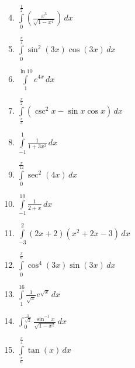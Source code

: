 \documentclass[12pt]{article}
\newif\ifans
\begin{document}
\begin{enumerate}
\setcounter{enumi}{3}

\item $\int\limits_{0}^{\frac{1}{2}}\left(\frac{x^3}{\sqrt{1-x^4}}\right)\,dx$ 

\ifans{\fbox{$\frac{4-\sqrt{15}}{8}$}} \fi

\item $\int\limits_{0}^{\frac{\pi}{4}} \sin^{2}(3x)\cos{(3x)}\,dx$ 

\ifans{\fbox{$\frac{\sqrt{2}}{36}$}} \fi

\item $\int\limits_{1}^{\ln{10}}e^{4x}\,dx$ 

\ifans{\fbox{$2500-\frac{1}{4}e^{4}$}} \fi

\item $\int\limits_{\frac{\pi}{3}}^{\frac{\pi}{2}}(\csc^{2}{x}-\sin{x}\cos{x})\,dx$ 

\ifans{\fbox{$\frac{1}{\sqrt{3}}-\frac{1}{8}$}} \fi

\item $\int\limits_{-1}^{1}\frac{1}{1+3x^2}\,dx$ 

\ifans{\fbox{$\frac{2\pi\sqrt{3}}{9}$}} \fi

\item $\int\limits_{0}^{\frac{\pi}{12}} \sec^2{(4x)}\,dx$ 

\ifans{\fbox{$\frac{\sqrt{3}}{4}$}} \fi

\item $\int\limits_{-1}^{10}\frac{1}{2+x}\,dx$ 

\ifans{\fbox{$\ln{12}$}} \fi

\item $\int\limits_{-3}^{2} (2x+2)(x^2+2x-3)\,dx$ 

\ifans{\fbox{$\frac{25}{2}$}} \fi

\item $\int\limits_{0}^{\frac{\pi}{6}} \cos^4{(3x)}\sin{(3x)}\,dx$ 

\ifans{\fbox{$\frac{1}{15}$}} \fi

\item $\int\limits_{1}^{16}\frac{1}{\sqrt{x}}e^{\sqrt{x}}\,dx$ 

\ifans{\fbox{$-2e+2e^{4}$}} \fi

\item $\int_0^{\frac{1}{\sqrt{2}}} \frac{\sin^{-1}{x}}{\sqrt{1-x^2}} \,dx$

\ifans{\fbox{$\frac{\pi^2}{32}$}} \fi

\item $\int\limits_{\frac{\pi}{6}}^{\frac{\pi}{4}}\tan{(x)}\,dx$ 


\end{enumerate}
\end{document}

